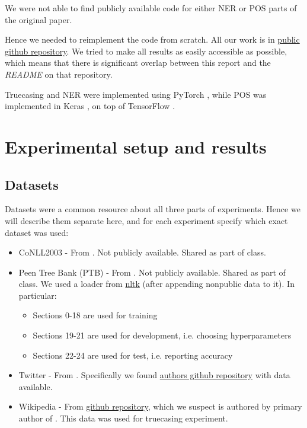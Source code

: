 \documentclass[11pt,a4paper]{article}
\begin{document}
We were not able to find publicly available code for either NER or POS parts of the original paper.

Hence we needed to reimplement the code from scratch. All our work is in \href{https://github.com/andreaskuster/uw-nlp}{public github repository}. We tried to make all results as easily accessible as possible, which means that there is significant overlap between this report and the \textit{README} on that repository.

Truecasing and NER were implemented using PyTorch \cite{pytorch}, while POS was implemented in Keras \cite{keras}, on top of TensorFlow \cite{tensorflow2015-whitepaper}.

\section{Experimental setup and results}

\subsection{Datasets}
\label{sec:datasets}
Datasets were a common resource about all three parts of experiments. Hence we will describe them separate here, and for each experiment specify which exact dataset was used:
\begin{itemize}
    \item CoNLL2003 - From \cite{conll2003}. Not publicly available. Shared as part of class.
    \item Peen Tree Bank (PTB) - From \cite{penn-treebank}. Not publicly available. Shared as part of class. We used a loader from \href{https://www.nltk.org/}{nltk} (after appending nonpublic data to it). In particular:
        \begin{itemize}
            \item Sections 0-18 are used for training
            \item Sections 19-21 are used for development, i.e. choosing hyperparameters
            \item Sections 22-24 are used for test, i.e. reporting accuracy
        \end{itemize}
    \item Twitter - From \cite{twitter-dataset}. Specifically we found \href{https://github.com/GateNLP/broad_twitter_corpus}{authors github repository} with data available.
    \item Wikipedia - From \href{https://github.com/raymondhs/char-rnn-truecase/tree/master/data/wiki}{github repository}, which we suspect is authored by primary author of \cite{susanto-etal-2016-learning}. This data was used for truecasing experiment.
\end{itemize}
\end{document}

